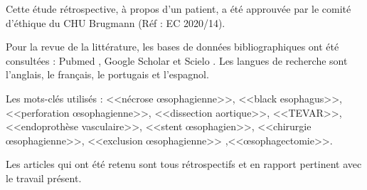 \documentclass[./tfe.tex]{subfiles}
\begin{document}
Cette étude rétrospective, à propos d’un patient, a été approuvée par le comité d’éthique du CHU Brugmann (Réf : EC 2020/14).

Pour la revue de la littérature, les bases de données bibliographiques ont été consultées : Pubmed , Google Scholar et Scielo . Les langues de recherche sont l’anglais, le français, le portugais et l’espagnol.

Les mots-clés utilisés : <<nécrose œsophagienne>>, <<black esophagus>>, <<perforation œsophagienne>>, <<dissection aortique>>, <<TEVAR>>, <<endoprothèse vasculaire>>, <<stent œsophagien>>, <<chirurgie œsophagienne>>, <<exclusion œsophagienne>> ,<<œsophagectomie>>.

Les articles qui ont été retenu sont tous rétrospectifs et en rapport pertinent avec le travail présent.
\end{document}

